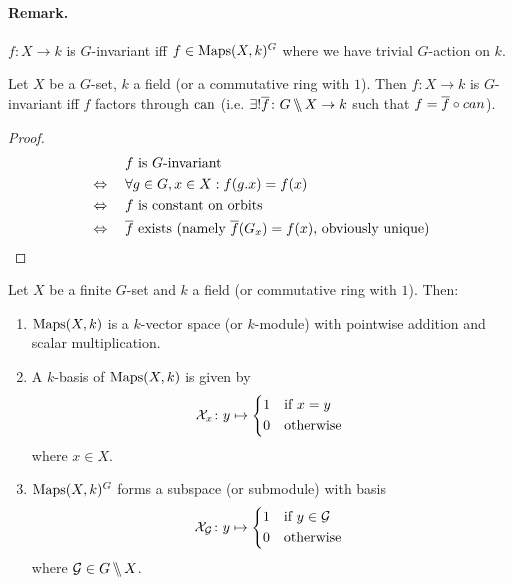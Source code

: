 \documentclass[12pt,a4paper]{scrartcl}
\begin{document}
\begin{otherlanguage}{english}
\paragraph{Remark.}
$f\colon X \to k$ is $G$-invariant iff $f\in \operatorname{Maps}(X,k)^G$ where we have trivial $G$-action on $k$.

\begin{lem}
  Let $X$ be a $G$-set, $k$ a field (or a commutative ring with $1$). Then $f\colon X \to k$ is $G$-invariant iff $f$ factors through $\operatorname{can}$ (i.e. $\exists! \overline f\colon G\,\backslash\!\!\backslash\, X \to k$ such that $f = \overline f \circ can$).
  \begin{center}
  \end{center}
\end{lem}
\begin{proof}
  \begin{align*}
    &\phantom{{}\Leftrightarrow{}}\quad \text{$f$ is $G$-invariant} \\
    &\Leftrightarrow\quad \forall g\in G, x \in X : f(g.x) = f(x) \\
    &\Leftrightarrow\quad \text{$f$ is constant on orbits} \\
    &\Leftrightarrow\quad \text{$\ol f$ exists (namely $\ol f(G_x) = f(x)$, obviously unique)}
  \end{align*}
\end{proof}
\begin{lem} \label{lem:I.7}
  Let $X$ be a finite $G$-set and $k$ a field (or commutative ring with $1$). Then:
  \begin{enumerate}
    \item\label{lem:I.7:1} $\operatorname{Maps}(X,k)$ is a $k$-vector space (or $k$-module) with pointwise addition and scalar multiplication.
    \item\label{lem:I.7:2} A $k$-basis of $\operatorname{Maps}(X,k)$ is given by \[ \Xs_x\colon y \mapsto \begin{cases*} 1 & if $x = y$ \\ 0 & otherwise \end{cases*}\] where $x \in X$.
    \item\label{lem:I.7:3} $\operatorname{Maps}(X,k)^G$ forms a subspace (or submodule) with basis \[ \Xs_\Gs \colon y \mapsto \begin{cases*} 1 & if $y \in \Gs$ \\ 0 & otherwise \end{cases*} \] where $\mathcal{G} \in G\,\backslash\!\!\backslash\, X$.

\end{enumerate}
\end{lem}
\end{otherlanguage}
\end{document}
